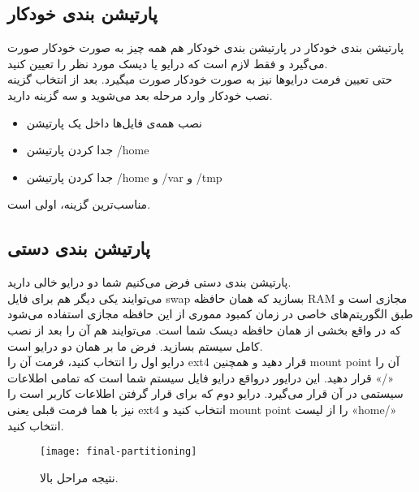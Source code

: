 \subsection{پارتیشن بندی خودکار}
\begin{frame}{پارتیشن بندی خودکار}
  در پارتیشن بندی خودکار هم همه چیز به صورت خودکار صورت می‌گیرد و فقط لازم است که درایو یا دیسک مورد نظر را تعیین کنید.\\
  حتی تعیین فرمت درایوها نیز به صورت خودکار صورت میگیرد.
  بعد از انتخاب گزینه نصب خودکار وارد مرحله بعد می‌شوید و سه گزینه دارید.\\
  \begin{itemize}
    \item نصب همه‌ی فایل‌ها داخل یک پارتیشن
    \item جدا کردن پارتیشن /home
    \item جدا کردن پارتیشن /home و /var و /tmp
  \end{itemize}
  مناسب‌ترین گزینه، اولی است.
\end{frame}
\subsection{پارتیشن بندی دستی}
\begin{frame}{پارتیشن بندی دستی}
  فرض می‌کنیم شما دو درایو خالی دارید.\\ می‌توایند یکی دیگر هم برای فایل swap بسازید که همان حافظه RAM مجازی است و طبق الگوریتم‌های خاصی در زمان کمبود مموری از این حافظه مجازی استفاده می‌شود که در واقع بخشی از همان حافظه دیسک شما است. می‌توایند هم آن را بعد از نصب کامل سیستم بسازید.
  فرض ما بر همان دو درایو است.\\
  درایو اول را انتخاب کنید، فرمت آن را ext4 قرار دهید و همچنین mount point آن را «/» قرار دهید. این درایور درواقع درایو فایل سیستم شما است که تمامی اطلاعات سیستمی در آن قرار می‌گیرد.
  درایو دوم که برای قرار گرفتن اطلاعات کاربر است را نیز با هما فرمت قبلی یعنی ext4 انتخاب کنید و mount point را از لیست «home/» انتخاب کنید.\\
 \begin{figure}
    \texttt{[image: final-partitioning]}
    \caption{ نتیجه مراحل بالا.~\cite{fig:finish_partitioning}}
  \end{figure}
\end{frame}
